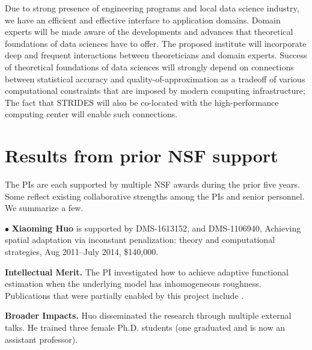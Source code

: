 \documentclass[12pt]{article}
\begin{document}
Due to strong presence of engineering programs and local data science industry, we have an efficient and effective interface to application domains.
Domain experts will be made aware of the developments and advances that theoretical foundations of data sciences have to offer.
The proposed institute will incorporate deep and frequent interactions between
theoreticians and domain experts.
Success of theoretical foundations of data sciences will strongly depend on connections between statistical accuracy and quality-of-approximation as a tradeoff of various computational constraints that are imposed by
modern computing infrastructure; The fact that STRIDES will also be co-located with the high-performance computing center will enable such connections.


\vspace*{1em}
\section{Results from prior NSF support}%
\vspace*{-0.5em}

The PIs are each supported by multiple NSF awards during the prior five years. Some reflect existing collaborative strengths among the PIs and senior personnel.
We summarize a few.
\vspace*{0.25em}

\noindent$\bullet$
{\bf Xiaoming Huo} is supported by DMS-1613152, and DMS-1106940, Achieving spatial adaptation via inconstant penalization: theory and computational strategies, Aug 2011--July 2014, \$140,000.

{\bf Intellectual Merit.}
The PI investigated how to achieve adaptive functional estimation when the underlying model has inhomogeneous roughness.
Publications that were partially enabled by this project include \cite{YangBook2014,Xu-13-pakdd,Kim-12-jns,Bastani-13-TASE,Wang-13-sp,Kim-13-aml,Kim-14-aor,Kim-14-ejs, Kim-14-TASE,Zhang-14,Wang-15-cusum,Huo-15-technometrics,Debraj-12-icdcs,lu-12-TAC,Huo-15-technometrics}.

{\bf Broader Impacts.} Huo disseminated the research through multiple external talks. He trained three female Ph.D. students (one graduated and is now an assistant professor).
\end{document}
